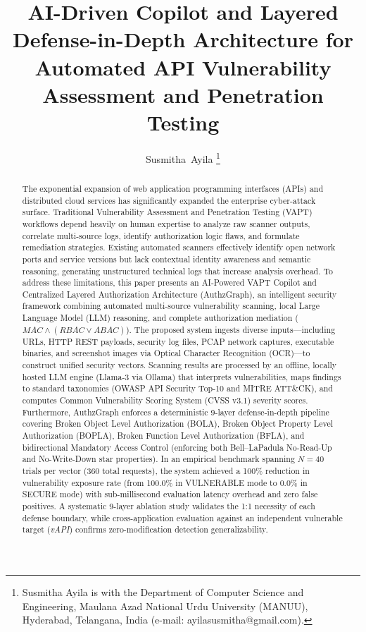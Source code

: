\documentclass[journal]{IEEEtran}
\begin{document}
\title{AI-Driven Copilot and Layered Defense-in-Depth Architecture for Automated API Vulnerability Assessment and Penetration Testing}

\author{Susmitha~Ayila%
\thanks{Susmitha Ayila is with the Department of Computer Science and Engineering, Maulana Azad National Urdu University (MANUU), Hyderabad, Telangana, India (e-mail: ayilasusmitha@gmail.com).}}

\maketitle

\begin{abstract}
The exponential expansion of web application programming interfaces (APIs) and distributed cloud services has significantly expanded the enterprise cyber-attack surface. Traditional Vulnerability Assessment and Penetration Testing (VAPT) workflows depend heavily on human expertise to analyze raw scanner outputs, correlate multi-source logs, identify authorization logic flaws, and formulate remediation strategies. Existing automated scanners effectively identify open network ports and service versions but lack contextual identity awareness and semantic reasoning, generating unstructured technical logs that increase analysis overhead. To address these limitations, this paper presents an AI-Powered VAPT Copilot and Centralized Layered Authorization Architecture (AuthzGraph), an intelligent security framework combining automated multi-source vulnerability scanning, local Large Language Model (LLM) reasoning, and complete authorization mediation ($MAC \land (RBAC \lor ABAC)$). The proposed system ingests diverse inputs—including URLs, HTTP REST payloads, security log files, PCAP network captures, executable binaries, and screenshot images via Optical Character Recognition (OCR)—to construct unified security vectors. Scanning results are processed by an offline, locally hosted LLM engine (Llama-3 via Ollama) that interprets vulnerabilities, maps findings to standard taxonomies (OWASP API Security Top-10 and MITRE ATT\&CK), and computes Common Vulnerability Scoring System (CVSS v3.1) severity scores. Furthermore, AuthzGraph enforces a deterministic 9-layer defense-in-depth pipeline covering Broken Object Level Authorization (BOLA), Broken Object Property Level Authorization (BOPLA), Broken Function Level Authorization (BFLA), and bidirectional Mandatory Access Control (enforcing both Bell--LaPadula No-Read-Up and No-Write-Down star properties). In an empirical benchmark spanning $N=40$ trials per vector (360 total requests), the system achieved a 100\% reduction in vulnerability exposure rate (from 100.0\% in VULNERABLE mode to 0.0\% in SECURE mode) with sub-millisecond evaluation latency overhead and zero false positives. A systematic 9-layer ablation study validates the 1:1 necessity of each defense boundary, while cross-application evaluation against an independent vulnerable target (\textit{vAPI}) confirms zero-modification detection generalizability.
\end{abstract}
\end{document}
